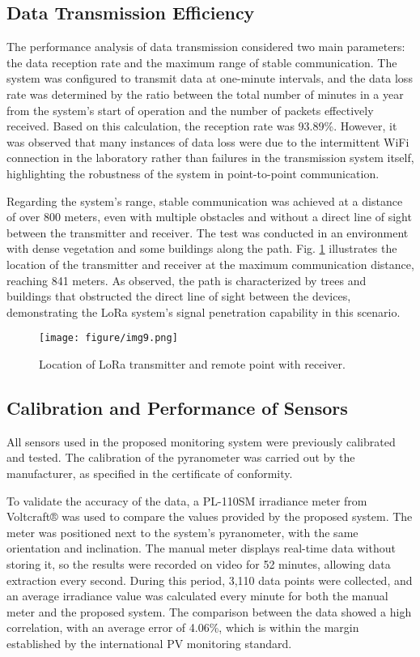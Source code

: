 \subsection{Data Transmission Efficiency} The performance analysis of data transmission considered two main parameters: the data reception rate and the maximum range of stable communication. The system was configured to transmit data at one-minute intervals, and the data loss rate was determined by the ratio between the total number of minutes in a year from the system’s start of operation and the number of packets effectively received. Based on this calculation, the reception rate was 93.89\%. However, it was observed that many instances of data loss were due to the intermittent WiFi connection in the laboratory rather than failures in the transmission system itself, highlighting the robustness of the system in point-to-point communication.

Regarding the system's range, stable communication was achieved at a distance of over 800 meters, even with multiple obstacles and without a direct line of sight between the transmitter and receiver. The test was conducted in an environment with dense vegetation and some buildings along the path. Fig. \ref{fig:mapaLEA} illustrates the location of the transmitter and receiver at the maximum communication distance, reaching 841 meters. As observed, the path is characterized by trees and buildings that obstructed the direct line of sight between the devices, demonstrating the LoRa system’s signal penetration capability in this scenario.

\begin{figure}[h]
    \centering
    \texttt{[image: figure/img9.png]}
    \caption{Location of LoRa transmitter and remote point with receiver.}    
    \label{fig:mapaLEA}
\end{figure}


\subsection{Calibration and Performance of Sensors}  
All sensors used in the proposed monitoring system were previously calibrated and tested. The calibration of the pyranometer was carried out by the manufacturer, as specified in the certificate of conformity.  


To validate the accuracy of the data, a PL-110SM irradiance meter from Voltcraft® was used to compare the values provided by the proposed system. The meter was positioned next to the system's pyranometer, with the same orientation and inclination. The manual meter displays real-time data without storing it, so the results were recorded on video for 52 minutes, allowing data extraction every second. During this period, 3,110 data points were collected, and an average irradiance value was calculated every minute for both the manual meter and the proposed system. The comparison between the data showed a high correlation, with an average error of 4.06\%, which is within the margin established by the international PV monitoring standard.

